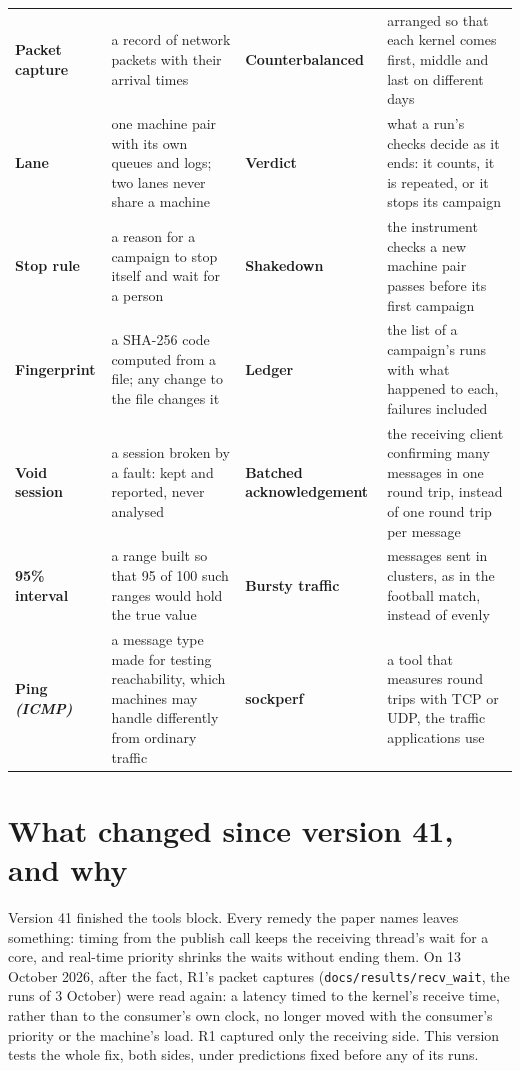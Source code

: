 \documentclass[11pt]{article}
\newcommand{\gl}[1]{{\color{soft}\itshape\small (#1)}}
\begin{document}
{\begin{tabularx}{\linewidth}{@{}>{\bfseries}p{3.1cm} X >{\bfseries}p{3.1cm} X@{}}
Packet capture & a record of network packets with their arrival times & Counterbalanced & arranged so that each kernel comes first, middle and last on different days \\
Lane & one machine pair with its own queues and logs; two lanes never share a machine & Verdict & what a run's checks decide as it ends: it counts, it is repeated, or it stops its campaign \\
Stop rule & a reason for a campaign to stop itself and wait for a person & Shakedown & the instrument checks a new machine pair passes before its first campaign \\
Fingerprint & a SHA-256 code computed from a file; any change to the file changes it & Ledger & the list of a campaign's runs with what happened to each, failures included \\
Void session & a session broken by a fault: kept and reported, never analysed & Batched acknowledgement & the receiving client confirming many messages in one round trip, instead of one round trip per message \\
95\% interval & a range built so that 95 of 100 such ranges would hold the true value & Bursty traffic & messages sent in clusters, as in the football match, instead of evenly \\
Ping \gl{ICMP} & a message type made for testing reachability, which machines may handle differently from ordinary traffic & sockperf & a tool that measures round trips with TCP or UDP, the traffic applications use \\
\end{tabularx}}

\section*{What changed since version 41, and why}
Version 41 finished the tools block. Every remedy the paper names leaves something: timing from
the publish call keeps the receiving thread's wait for a core, and real-time priority shrinks the
waits without ending them. On 13 October 2026, after the fact, R1's packet captures
(\texttt{docs/results/recv\_wait}, the runs of 3 October) were read again: a latency timed to the
kernel's receive time, rather than to the consumer's own clock, no longer moved with the consumer's
priority or the machine's load. R1 captured only the receiving side. This version tests the whole
fix, both sides, under predictions fixed before any of its runs.
\end{document}
